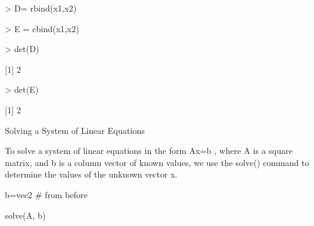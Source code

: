 > D= rbind(x1,x2)


> E = cbind(x1,x2)


> det(D)


[1] 2


> det(E)


[1] 2

 


Solving a System of Linear Equations


To solve a system of linear equations in the form Ax=b , where A is a square matrix, and b is a column vector of known values, we use the solve() command to determine the values of the unknown vector x.










b=vec2  # from before


solve(A, b) 
 



